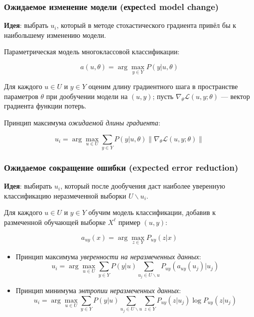 \documentclass[fullscreen=true, bookmarks=true, hyperref={pdfencoding=unicode}]{beamer}
\begin{document}
\begin{frame}
  \frametitle{Ожидаемое изменение модели (ехресted model change)}

  {\bf Идея}: выбрать $u_i$, который в методе стохастического градиента привёл бы к наибольшему изменению модели.

  Параметрическая модель многоклассовой классификации:

  $$ a(u, \theta) = \arg\max\limits_{y \in Y} P(y|u, \theta)$$

  Для каждого $u \in U$ и $y \in Y$ оценим длину градиентного шага в пространстве параметров $\theta$ при дообучении модели на $(u,y)$;
  пусть $\nabla_\theta \mathscr{L}(u,y; \theta)$ — вектор градиента функции потерь.

  \vspace{0.5cm}
  Принцип максимума {\it ожидаемой длины градиента}:

 $$ u_i = \arg\max\limits_{u \in U} \sum\limits_{y \in Y} P(y| u, \theta) \| \nabla_\theta \mathscr{L}(u,y; \theta) \| $$
\end{frame}


\begin{frame}
  \frametitle{Ожидаемое сокращение ошибки (expected error reduction)}

  {\bf Идея}: выбирать $u_i$, который после дообучения даст наиболее
  уверенную классификацию неразмеченной выборки $U \backslash u_i$.

  Для каждого $u \in U$ и $y \in Y$ обучим модель классификации,
  добавив к размеченной обучающей выборке $X^\ell$ пример $(u,y)$:

  $$ a_{uy}(x) = \arg\max\limits_{z \in Y} P_{uy}(z|x)$$

  \begin{itemize}
    \item Принцип максимума {\it уверенности на неразмеченных данных}:
    $$ u_i = \arg\max\limits_{u \in U} \sum\limits_{y \in Y} P(y|u) \sum\limits_{u_j \in U \backslash u }
    P_{uy}(a_{uy}(u_j) | u_j)$$
    \item Принцип минимума {\it энтропии неразмеченных данных}:
    $$ u_i = \arg\max\limits_{u \in U} \sum\limits_{y \in Y} P(y|u) \sum\limits_{u_j \in U \backslash u }
    \sum\limits_{z \in Y} P_{uy}(z|u_j) \log P_{uy} (z | u_j)$$
  \end{itemize}

\end{frame}
\end{document}

